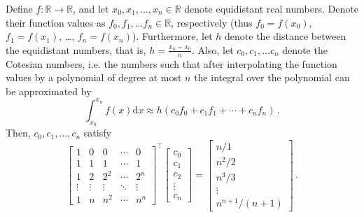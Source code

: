 \begin{theorem}
\label{theorem:mat}
Define $f: \mathbb R \to \mathbb R$, and let $x_0, x_1, \dots, x_n \in \mathbb R$ denote equidistant real numbers.
Denote their function values as $f_0, f_1, \dots f_n \in \mathbb R$, respectively (thus $f_0=f(x_0)$, $f_1=f(x_1)$, \dots, $f_n = f(x_n)$).
Furthermore, let $h$ denote the distance between the equidistant numbers, that is, $h=\frac{x_n-x_0}{n}$.
Also, let $c_0, c_1, \dots c_n$ denote the Cotesian numbers, i.e. the numbers such that after interpolating the function values by a polynomial of degree at most $n$ the integral over the polynomial can be approximated by
\begin{equation}
    \int_{x_0}^{x_n} f(x) \mathrm dx \approx h(c_0 f_0 + c_1f_1 + \cdots + c_nf_n) \,. \nonumber
\end{equation}
Then, $c_0, c_1, \dots, c_n$ satisfy
\begin{equation}
    \begin{bmatrix}
        1&0&0&\cdots&0 \\
        1&1&1&\cdots&1 \\
        1&2&2^2&\cdots&2^n \\
        \vdots&\vdots & \vdots & \ddots & \vdots\\
        1&n&n^2&\cdots&n^n
    \end{bmatrix}^\top
    \begin{bmatrix}
        c_0\\
        c_1\\
        c_2\\
        \vdots \\
        c_n
    \end{bmatrix}
    =
    \begin{bmatrix}
        n/1 \\
        n^2/2 \\
        n^3/3 \\
        \vdots \\
        n^{n+1}/(n+1)
    \end{bmatrix} \,.\nonumber
\end{equation}
\end{theorem}

